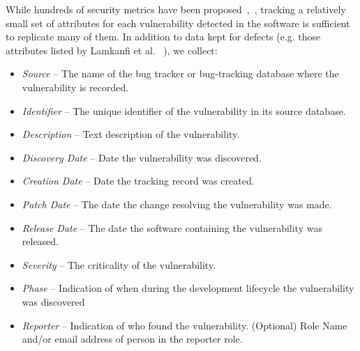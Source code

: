While hundreds of security metrics have been proposed~\cite{rudolph2012critical},~\cite{verendel2009quantified}, tracking a relatively small set of attributes for each vulnerability detected in the software is sufficient to replicate many of them. In addition to data kept for defects (e.g. those attributes listed by Lamkanfi et al.  ~\cite{lamkanfi2013eclipse}), we collect:
\begin{itemize}
\item \textit{Source} – The name of the bug tracker or bug-tracking database where the vulnerability is recorded.
\item \textit{Identifier} – The unique identifier of the vulnerability in its source database.
\item \textit{Description} – Text description of the vulnerability.
\item \textit{Discovery Date} – Date the vulnerability was discovered. 
\item \textit{Creation Date} – Date the tracking record was created.
\item \textit{Patch Date} – The date the change resolving the vulnerability was made.
\item \textit{Release Date} – The date the software containing the vulnerability was released.
\item \textit{Severity} – The criticality of the vulnerability. 
\item \textit{Phase}  – Indication of when during the development lifecycle the vulnerability was discovered
\item \textit{Reporter} – Indication of who found the vulnerability. (Optional) Role Name and/or email address of person in the reporter role. 
\end{itemize}


